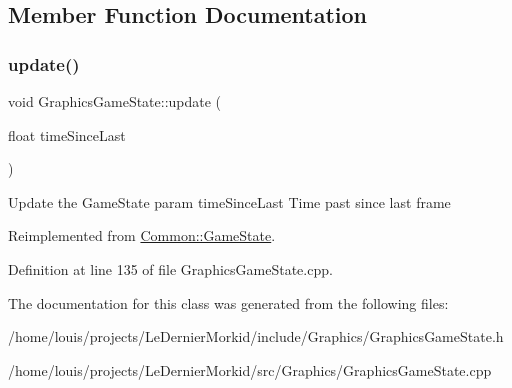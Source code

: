 \subsection{Member Function Documentation}
\mbox{\label{class_graphics_game_state_a5a2543a4cdd551c98f4540707bc7213e}} 
\subsubsection{\texorpdfstring{update()}{update()}}
{\footnotesize\ttfamily void Graphics\+Game\+State\+::update (\begin{DoxyParamCaption}\item[{float}]{time\+Since\+Last }\end{DoxyParamCaption})\hspace{0.3cm}{\ttfamily [virtual]}}

Update the Game\+State param time\+Since\+Last Time past since last frame 

Reimplemented from \hyperlink{class_common_1_1_game_state_a38271924996d8c1bbdcbfee6ffe63f95}{Common\+::\+Game\+State}.



Definition at line 135 of file Graphics\+Game\+State.\+cpp.



The documentation for this class was generated from the following files\+:\begin{DoxyCompactItemize}
\item 
/home/louis/projects/\+Le\+Dernier\+Morkid/include/\+Graphics/Graphics\+Game\+State.\+h\item 
/home/louis/projects/\+Le\+Dernier\+Morkid/src/\+Graphics/Graphics\+Game\+State.\+cpp\end{DoxyCompactItemize}
